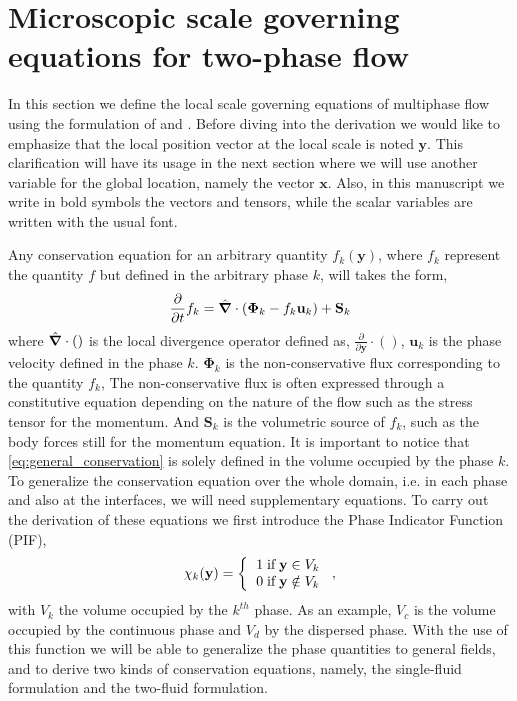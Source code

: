 
\section{Microscopic scale governing equations for two-phase flow}
\label{sec:conservation_laws}

In this section we define the local scale governing equations of multiphase flow using the formulation of \citet{kataoka1986local} and \citet{drew1983mathematical}. 
Before diving into the derivation we would like to emphasize that the local position vector at the local scale is noted $\textbf{y}$.
This clarification will have its usage in the next section where we will use another variable for the global location, namely the vector $\textbf{x}$. 
Also, in this manuscript we write in bold symbols the vectors and tensors, while the scalar variables are written with the usual font. 

Any conservation equation for an arbitrary quantity $f_k(\textbf{y})$, where $f_k$ represent the quantity $f$ but defined in the arbitrary phase $k$, will takes the form,
\begin{equation}
    \frac{\partial}{\partial t} f_k
    = \hat{\bm{\nabla}} \cdot \left(
        \bm{\Phi}_k
        - f_k\textbf{u}_k
        \right)
    + \textbf{S}_k
    \label{eq:general_conservation}
\end{equation}
where $\hat{\bm{\nabla}}\cdot()$ is the local divergence operator defined as, $\frac{\partial}{\partial \textbf{y}}\cdot()$, $\textbf{u}_k$ is the phase velocity defined in the phase $k$. 
$\bm{\Phi}_k$ is the non-conservative flux corresponding to the quantity $f_k$,
The non-conservative flux is often expressed through a constitutive equation depending on the nature of the flow such as the stress tensor for the momentum. 
And $\textbf{S}_k$ is the volumetric source of $f_k$, such as the body forces still for the momentum equation.
It is important to notice that \ref{eq:general_conservation} is solely defined in the volume occupied by the phase $k$.
To generalize the conservation equation over the whole domain, i.e. in each phase and also at the interfaces, we will need supplementary equations. 
To carry out the derivation of these equations we first introduce the Phase Indicator Function (PIF),
\begin{equation}
    \chi_k(\textbf{y}) =  \left\{
      \begin{tabular}{cc}
        $1 \;\text{if} \;\textbf{y} \in V_k$\\
        $0 \;\text{if} \;\textbf{y} \notin V_k$
      \end{tabular}
      \right.,
      \label{eq:phase_indicator}
\end{equation}
with $V_k$ the volume occupied by the $k^{th}$ phase.
As an example, $V_c$ is the volume occupied by the continuous phase and $V_d$ by the dispersed phase. 
With the use of this function we will be able to generalize the phase quantities to general fields, and to derive two kinds of conservation equations, namely, the single-fluid formulation and the two-fluid formulation. 

